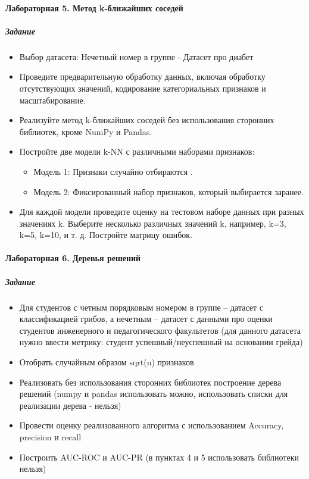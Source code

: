 \documentclass[12pt,onecolumn]{article}
\begin{document}
\paragraph{Лабораторная 5. Метод k-ближайших соседей}
\subparagraph{Задание}
\begin{itemize}
  \item Выбор датасета: Нечетный номер в группе - Датасет про диабет
  \item Проведите предварительную обработку данных, включая обработку отсутствующих значений, кодирование категориальных признаков и масштабирование.
  \item Реализуйте метод k-ближайших соседей без использования сторонних библиотек, кроме NumPy и Pandas. 
  \item Постройте две модели k-NN с различными наборами признаков:
      \begin{itemize}
        \item Модель 1: Признаки случайно отбираются .
        \item Модель 2: Фиксированный набор признаков, который выбирается заранее.
      \end{itemize}
  \item Для каждой модели проведите оценку на тестовом наборе данных при разных значениях k. Выберите несколько различных значений k, например, k=3, k=5, k=10, и т. д. Постройте матрицу ошибок.
\end{itemize}
\paragraph{Лабораторная 6. Деревья решений}
\subparagraph{Задание}
\begin{itemize}
  \item Для студентов с четным порядковым номером в группе – датасет с классификацией грибов, а нечетным – датасет с данными про оценки студентов инженерного и педагогического факультетов (для данного датасета нужно ввести метрику: студент успешный/неуспешный на основании грейда)
  \item Отобрать случайным образом sqrt(n) признаков
  \item Реализовать без использования сторонних библиотек построение дерева решений (numpy и pandas использовать можно, использовать списки для реализации  дерева - нельзя)
  \item Провести оценку реализованного алгоритма с использованием Accuracy, precision и recall
  \item Построить AUC-ROC и AUC-PR (в пунктах 4 и 5 использовать библиотеки нельзя)
\end{itemize}
\end{document}
